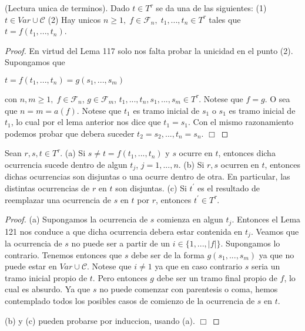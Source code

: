   \begin{theorem}
    (Lectura unica de terminos). Dado \(t\in T^{\tau } \) se da una de las siguientes:
    (1) \(t\in Var\cup \mathcal{C}\)
    (2) Hay unicos \(n\geq 1,\;f\in \mathcal{F} _{n},\;t_{1},...,t_{n}\in T^{\tau }\) tales que \( t=f(t_{1},...,t_{n})\).
  \end{theorem}
  \begin{proof}
    En virtud del Lema 117 solo nos falta probar la unicidad en el punto (2). Supongamos que

    \(\displaystyle t=f(t_{1},...,t_{n})=g(s_{1},...,s_{m}) \)

    con \(n,m\geq 1,\;f\in \mathcal{F}_{n}\), \(g\in \mathcal{F}_{m}\), \( t_{1},...,t_{n},s_{1},...,s_{m}\in T^{\tau }\). Notese que \(f=g\). O sea que \( n=m=a(f)\). Notese que \(t_{1}\) es tramo inicial de \(s_{1}\) o \(s_{1}\) es tramo inicial de \(t_{1}\), lo cual por el lema anterior nos dice que \(t_{1}=s_{1}\). Con el mismo razonamiento podemos probar que debera suceder \( t_{2}=s_{2},...,t_{n}=s_{n}\). \(\Box\)
  \end{proof}

  \begin{lemma}
    Sean \(r,s,t\in T^{\tau }\).
    (a) Si \(s\neq t=f(t_{1},...,t_{n})\) y \(s\) ocurre en \(t\), entonces dicha ocurrencia sucede dentro de algun \(t_{j}\), \(j=1,...,n\).
    (b) Si \(r,s\) ocurren en \(t\), entonces dichas ocurrencias son disjuntas o una ocurre dentro de otra. En particular, las distintas ocurrencias de \(r\) en \(t\) son disjuntas.
    (c) Si \(t^{\prime }\) es el resultado de reemplazar una ocurrencia de \(s\) en \(t\) por \(r\), entonces \(t^{\prime }\in T^{\tau }\).
  \end{lemma}
  \begin{proof}
    (a) Supongamos la ocurrencia de \(s\) comienza en algun \(t_{j}\). Entonces el Lema 121 nos conduce a que dicha ocurrencia debera estar contenida en \(t_{j}\). Veamos que la ocurrencia de \(s\) no puede ser a partir de un \(i\in \{1,...,\left\vert f\right\vert \}\). Supongamos lo contrario. Tenemos entonces que \(s\) debe ser de la forma \(g(s_{1},...,s_{m})\) ya que no puede estar en \(Var\cup \mathcal{C}\). Notese que \(i\neq 1\) ya que en caso contrario \(s\) seria un tramo inicial propio de \(t\). Pero entonces \(g\) debe ser un tramo final propio de \(f\), lo cual es absurdo. Ya que \(s\) no puede comenzar con parentesis o coma, hemos contemplado todos los posibles casos de comienzo de la ocurrencia de \(s\) en \(t\).

    (b) y (c) pueden probarse por induccion, usando (a). \(\Box\)
  \end{proof}

